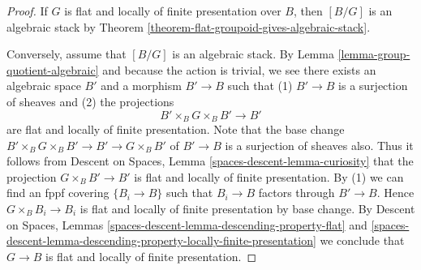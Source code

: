 \begin{proof}
If $G$ is flat and locally of finite presentation over $B$, then
$[B/G]$ is an algebraic stack by
Theorem \ref{theorem-flat-groupoid-gives-algebraic-stack}.

\medskip\noindent
Conversely, assume that $[B/G]$ is an algebraic stack. By
Lemma \ref{lemma-group-quotient-algebraic}
and because the action is trivial, we see
there exists an algebraic space $B'$ and a morphism
$B' \to B$ such that (1) $B' \to B$ is a surjection
of sheaves and (2) the projections
$$
B' \times_B G \times_B B' \to B'
$$
are flat and locally of finite presentation. Note that the base change
$B' \times_B G \times_B B' \to B' \to G \times_B B'$ of $B' \to B$
is a surjection of sheaves also. Thus it follows from
Descent on Spaces, Lemma \ref{spaces-descent-lemma-curiosity}
that the projection $G \times_B B' \to B'$ is flat and locally
of finite presentation. By (1) we can find an fppf covering
$\{B_i \to B\}$ such that $B_i \to B$ factors through $B' \to B$.
Hence $G \times_B B_i \to B_i$ is flat and locally of finite presentation
by base change. By
Descent on Spaces, Lemmas
\ref{spaces-descent-lemma-descending-property-flat} and
\ref{spaces-descent-lemma-descending-property-locally-finite-presentation}
we conclude that $G \to B$ is flat and locally of finite presentation.
\end{proof}


















